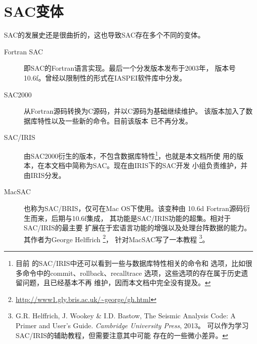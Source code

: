 \section{SAC变体}

SAC的发展史还是很曲折的，这也导致SAC存在多个不同的变体。

\begin{description}
\item[Fortran SAC]  即SAC的Fortran语言实现。最后一个分发版本发布于2003年，
                    版本号10.6f。曾经以限制性的形式在IASPEI软件库中分发。
\item[SAC2000]      从Fortran源码转换为C源码，并以C源码为基础继续维护。
                    该版本加入了数据库特性以及一些新的命令。目前该版本
                    已不再分发。
\item[SAC/IRIS]     由SAC2000衍生的版本，不包含数据库特性\footnote{目前
                    的SAC/IRIS中还可以看到一些与数据库特性相关的命令和
                    选项，比如很多命令中的commit、rollback、recalltrace
                    选项，这些选项的存在属于历史遗留问题，且已经基本不再
                    维护，因而本文档中完全没有提及。}，也就是本文档所使
                    用的版本，在本文档中简称为SAC。现在由IRIS下的SAC开发
                    小组负责维护，并由IRIS分发。
\item[MacSAC]       也称为SAC/BRIS，仅可在Mac OS下使用。该变种由
                    10.6d Fortran源码衍生而来，后期与10.6f集成，
                    其功能是SAC/IRIS功能的超集。相对于SAC/IRIS的最主要
                    扩展在于宏语言功能的增强以及处理台阵数据的能力。
                    其作者为George Helffrich
                    \footnote{\url{http://www1.gly.bris.ac.uk/~george/gh.html}}，
                    针对MacSAC写了一本教程
                    \footnote{G.R. Helffrich, J. Wookey \& I.D. Bastow,
                    The Seismic Analysis Code: A Primer and User's Guide.
                    \textsl{Cambridge University Press}, 2013。
                    可以作为学习SAC/IRIS的辅助教程，但需要注意其中可能
                    存在的一些微小差异。}。
\end{description}
